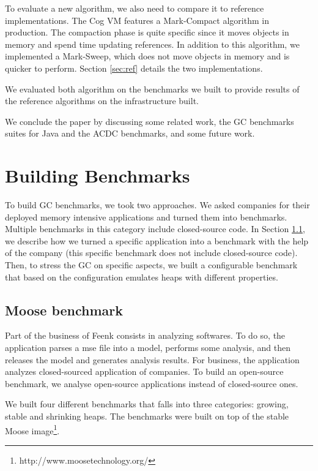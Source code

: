 \documentclass[10pt, sigplan]{acmart}
\begin{document}
To evaluate a new algorithm, we also need to compare it to reference implementations. The Cog VM features a Mark-Compact algorithm in production. The compaction phase is quite specific since it moves objects in memory and spend time updating references. In addition to this algorithm, we implemented a Mark-Sweep, which does not move objects in memory and is quicker to perform. Section \ref{sec:ref} details the two implementations.

We evaluated both algorithm on the benchmarks we built to provide results of the reference algorithms on the infrastructure built.

We conclude the paper by discussing some related work, the GC benchmarks suites for Java and the ACDC benchmarks, and some future work.

\section{Building Benchmarks}
\label{sec:bench}

To build GC benchmarks, we took two approaches. We asked companies for their deployed memory intensive applications and turned them into benchmarks. Multiple benchmarks in this category include closed-source code. In Section \ref{sec:mooseBench}, we describe how we turned a specific application into a benchmark with the help of the company (this specific benchmark does not include closed-source code). Then, to stress the GC on specific aspects, we built a configurable benchmark that based on the configuration emulates heaps with different properties. 

\subsection{Moose benchmark}
\label{sec:mooseBench}

Part of the business of Feenk consists in analyzing softwares. To do so, the application parses a mse file into a model, performs some analysis, and then releases the model and generates analysis results. For business, the application analyzes closed-sourced application of companies. To build an open-source benchmark, we analyse open-source applications instead of closed-source ones.

We built four different benchmarks that falls into three categories: growing, stable and shrinking heaps. The benchmarks were built on top of the stable Moose image\footnote{http://www.moosetechnology.org/}.
\end{document}
